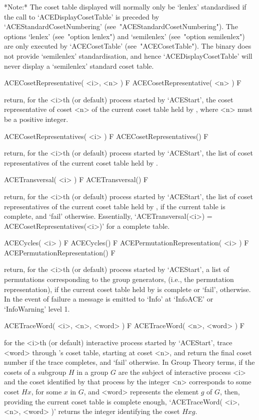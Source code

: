 *Note:*
The coset table displayed will normally only be `lenlex'  standardised
if   the   call   to    `ACEDisplayCosetTable'    is    preceded    by
`ACEStandardCosetNumbering'   (see~"ACEStandardCosetNumbering").   The
options `lenlex' (see~"option lenlex") and  `semilenlex'  (see~"option
semilenlex")     are     only     executed     by      `ACECosetTable'
(see~"ACECosetTable"). The {\ACE} binary does not provide `semilenlex'
standardisation, and hence `ACEDisplayCosetTable' will never display a
`semilenlex' standard coset table.

\>ACECosetRepresentative( <i>, <n> ) F
\>ACECosetRepresentative( <n> ) F

return, for the <i>th (or default) process started by `ACEStart',  the
coset representative of coset <n> of the current coset table  held  by
{\ACE}, where <n> must be a positive integer.

\>ACECosetRepresentatives( <i> ) F
\>ACECosetRepresentatives() F

return, for the <i>th (or default) process started by `ACEStart',  the
list of coset representatives of  the  current  coset  table  held  by
{\ACE}.

\>ACETransversal( <i> ) F
\>ACETransversal() F

return, for the <i>th (or default) process started by `ACEStart',  the
list of coset representatives of  the  current  coset  table  held  by
{\ACE}, if the  current  table  is  complete,  and  `fail'  otherwise.
Essentially, `ACETransversal(<i>) = ACECosetRepresentatives(<i>)'  for
a complete table.

\>ACECycles( <i> ) F
\>ACECycles() F
\>ACEPermutationRepresentation( <i> ) F
\>ACEPermutationRepresentation() F

return, for the <i>th (or default) process started  by  `ACEStart',  a
list of permutations corresponding to the group generators, (i.e., the
permutation representation), if the current coset table held by {\ACE}
is complete or `fail', otherwise. In the event of failure a message is
emitted to `Info' at `InfoACE' or `InfoWarning' level 1.

\>ACETraceWord( <i>, <n>, <word> ) F
\>ACETraceWord( <n>, <word> ) F

for the <i>th (or  default)  interactive  {\ACE}  process  started  by
`ACEStart', trace <word> through {\ACE}'s  coset  table,  starting  at
coset <n>, and return the final coset number if the  trace  completes,
and `fail' otherwise. In Group  Theory  terms,  if  the  cosets  of  a
subgroup $H$ in a group $G$ are  the  subject  of  interactive  {\ACE}
process <i> and the coset identified by that process  by  the  integer
<n> corresponds to some coset $Hx$, for some $x$ in  $G$,  and  <word>
represents the element $g$ of $G$, then, providing the  current  coset
table is complete enough, `ACETraceWord( <i>, <n>, <word>  )'  returns
the integer identifying the coset $Hxg$.

